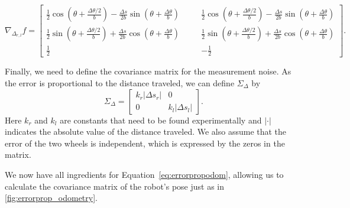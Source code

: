 \begin{scriptsize}
\begin{equation}
\nabla_{\Delta_{r,l}} f=\left[
\begin{array}{ccc}
\frac{1}{2}\cos(\theta+\frac{\Delta \theta/2}{b})
-\frac{\Delta s}{2b}\sin(\theta+\frac{\Delta \theta}{b})
& \quad & \frac{1}{2}\cos(\theta+\frac{\Delta \theta/2}{b})
-\frac{\Delta s}{2b}\sin(\theta+\frac{\Delta \theta}{b})
\\
\frac{1}{2}\sin(\theta+\frac{\Delta \theta/2}{b})
+\frac{\Delta s}{2b}\cos(\theta+\frac{\Delta \theta}{b})
& \quad & \frac{1}{2}\sin(\theta+\frac{\Delta \theta/2}{b})
+\frac{\Delta s}{2b}\cos(\theta+\frac{\Delta \theta}{b})
\\
\frac{1}{2} & \quad & -\frac{1}{2}
\end{array}
\right] .
\end{equation}
\end{scriptsize}

Finally, we need to define the covariance matrix for the measurement noise. As the error is proportional to the distance traveled, we can define $ \Sigma_{\Delta}$ by
\begin{equation}
\Sigma_{\Delta}=\left[\begin{array}{cc}k_r|\Delta s_r| & 0\\0 & k_l|\Delta s_l|\end{array}\right] .
\end{equation}
Here $ k_r$ and $ k_l$ are constants that need to be found experimentally and $ |\cdot |$ indicates the absolute value of the distance traveled. We also assume that the error of the two wheels is independent, which is expressed by the zeros in the matrix.

We now have all ingredients for Equation~\ref{eq:errorpropodom}, allowing us to calculate the covariance matrix of the robot's pose just as in \cref{fig:errorprop_odometry}.






